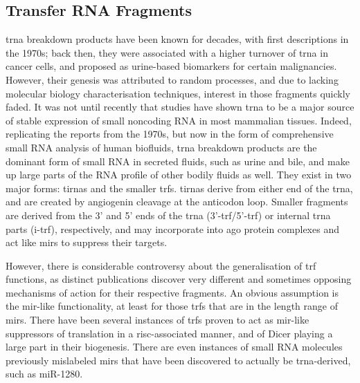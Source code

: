 \subsection{Transfer RNA Fragments} \label{sec:intro:trfs}
\Ac{trna} breakdown products have been known for decades, with first descriptions in the 1970s; back then, they were associated with a higher turnover of \ac{trna} in cancer cells,\cite{Borek1977} and proposed as urine-based biomarkers for certain malignancies.\cite{Speer1979} However, their genesis was attributed to random processes, and due to lacking molecular biology characterisation techniques, interest in those fragments quickly faded. It was not until recently that studies have shown \ac{trna} to be a major source of stable expression of small noncoding RNA\cite{Cole2009,Lee2009} in most mammalian tissues. Indeed, replicating the reports from the 1970s, but now in the form of comprehensive small RNA analysis of human biofluids,\cite{Godoy2018} \ac{trna} breakdown products are the dominant form of small RNA in secreted fluids, such as urine and bile, and make up large parts of the RNA profile of other bodily fluids as well. They exist in two major forms: \acp{tirna} and the smaller \acfp{trf}. \acp{tirna} derive from either end of the \ac{trna}, and are created by angiogenin cleavage at the anticodon loop.\cite{Yamasaki2009,Ivanov2011} Smaller fragments are derived from the 3’ and 5’ ends of the \ac{trna} (3'-\ac{trf}/5'-\ac{trf}) or internal \ac{trna} parts (i-\ac{trf}), respectively, and may incorporate into \ac{ago} protein complexes and act like \acp{mir} to suppress their targets.\cite{Burroughs2011,Kumar2014}

However, there is considerable controversy about the generalisation of \ac{trf} functions, as distinct publications discover very different and sometimes opposing mechanisms of action for their respective fragments. An obvious assumption is the \ac{mir}-like functionality, at least for those \acp{trf} that are in the length range of \acp{mir}. There have been several instances of \acp{trf} proven to act as \ac{mir}-like suppressors of translation in a \ac{risc}-associated manner,\cite{Kumar2014} and of Dicer playing a large part in their biogenesis.\cite{Cole2009} There are even instances of small RNA molecules previously mislabeled \acp{mir} that have been discovered to actually be \ac{trna}-derived, such as miR-1280.\cite{Huang2017}

